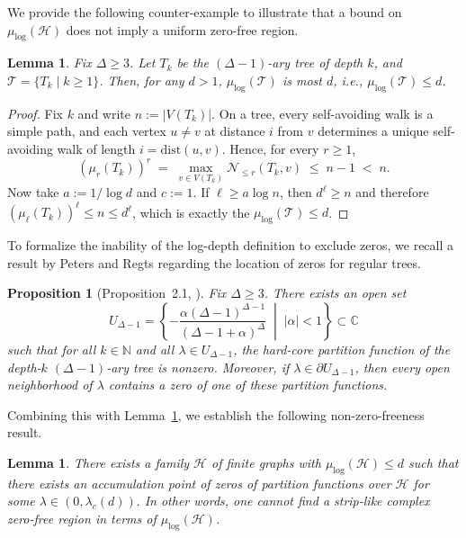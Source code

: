 \documentclass[a4paper,11pt]{article}
\theoremstyle{plain}
\newtheorem{lemma}[theorem]{Lemma}
\newtheorem{proposition}[theorem]{Proposition}
\theoremstyle{definition}
\theoremstyle{remark}
\newcommand{\1}{\mathbf{1}}
\begin{document}
We provide the following counter-example to illustrate that a bound on $\mu_{\log}(\mathcal{H})$ does not imply a uniform zero-free region.

\begin{lemma}
\label{lem:log-vacuity}
   Fix $\Delta\geq 3$. Let $T_k$ be the $(\Delta-1)$-ary tree of depth $k$, and $\mathcal{T}=\{T_k\mid k\geq 1\}$.
   Then, for any $d>1$, $\mu_{\log}(\mathcal{T})$ is most $d$, i.e., $\mu_{\log}(\mathcal{T})\leq d$.
\end{lemma}

\begin{proof}
Fix $k$ and write $n:=|V(T_k)|$. On a tree, every self-avoiding walk is a simple path, and each vertex $u\neq v$ at
distance $i$ from $v$ determines a unique self-avoiding walk of length $i=\mathrm{dist}(u,v)$. Hence, for every $r\ge 1$,
\[
(\mu_r(T_k))^r\;=\;\max_{v\in V(T_k)}\mathcal{N}_{\le r}(T_k,v)\;\le\; n-1\;<\; n.
\]
Now take $a:=1/\log d$ and $c:=1$. If $\ell\ge a\log n$, then $d^{\ell}\ge n$ and therefore
$(\mu_\ell(T_k))^\ell\le n\le d^{\ell}$, which is exactly the $\mu_{\log}(\mathcal{T})\leq d$.
\end{proof}

To formalize the inability of the log-depth definition to exclude zeros, we recall a result by Peters and Regts regarding the location of zeros for regular trees.

\begin{proposition}[Proposition~2.1, \cite{peters2019conjecture}]
\label{prop:peters-zeros}
Fix $\Delta\ge 3$. There exists an open set 
\begin{equation}
    U_{\Delta-1}=\left\{-\frac{\alpha(\Delta-1)^{\Delta-1}}{(\Delta-1+\alpha)^\Delta} \;\middle|\; |\alpha|<1\right\}\subset\mathbb{C}
\end{equation} 
such that for all $k\in\mathbb N$ and all
$\lambda\in U_{\Delta-1}$, the hard-core partition function of the depth-$k$ $(\Delta-1)$-ary tree is nonzero. Moreover,
if $\lambda\in\partial U_{\Delta-1}$, then every open neighborhood of $\lambda$ contains a zero of one of these
partition functions.
\end{proposition}

Combining this with Lemma~\ref{lem:log-vacuity}, we establish the following non-zero-freeness result.

\begin{lemma}
    There exists a family $\mathcal{H}$ of finite graphs with $\mu_{\log}(\mathcal{H})\leq d$ such that there exists an accumulation point of zeros of partition functions over $\mathcal{H}$ for some $\lambda\in(0, \lambda_c(d)).$ In other words, one cannot find a strip-like complex zero-free region in terms of $\mu_{\log}(\mathcal{H})$.
\end{lemma}
\end{document}
